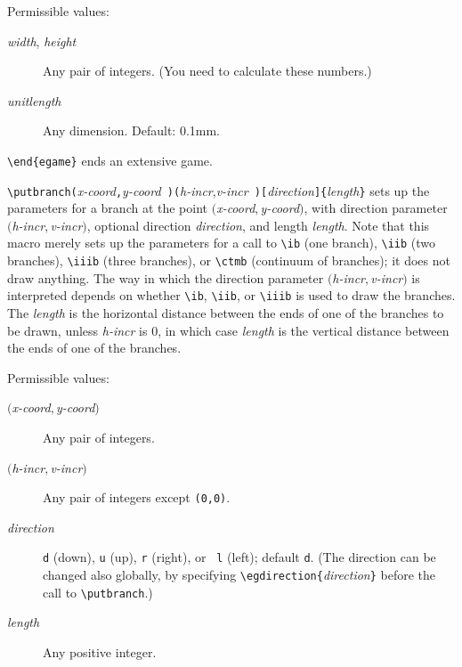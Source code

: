 \documentclass[12pt]{article}
\begin{document}
Permissible values:
\begin{description}
\item[\emph{width}, \emph{height}] Any pair of integers.  (You need to
calculate these numbers.)
\item[\emph{unitlength}] Any dimension.  Default: 0.1mm.
\end{description}

\vspace{4mm}

\noindent\verb+\end{egame}+\newline
\noindent ends an extensive game.

\vspace{4mm}

\noindent\verb+\putbranch(+\emph{x-coord}\verb+,+\emph{y-coord}{\tt
)(}\emph{h-incr},\emph{v-incr}{\tt
)[}\emph{direction}\verb+]{+\emph{length}\verb+}+\newline
\noindent sets up the parameters for a branch at the point
$($\emph{x-coord}$,$\emph{y-coord}$)$, with direction parameter
$($\emph{h-incr}$,$\emph{v-incr}$)$, optional direction \emph{direction}, and
length \emph{length}.  Note that this macro merely sets up the parameters for
a call to \verb+\ib+ (one branch), \verb+\iib+ (two branches), \verb+\iiib+
(three branches), or \verb+\ctmb+ (continuum of branches); it does not draw
anything.  The way in which the direction parameter
$($\emph{h-incr}$,$\emph{v-incr}$)$ is interpreted depends on whether
\verb+\ib+, \verb+\iib+, or \verb+\iiib+ is used to draw the branches.  The
\emph{length} is the horizontal distance between the ends of one of the
branches to be drawn, unless \emph{h-incr} is 0, in which case \emph{length}
is the vertical distance between the ends of one of the branches.

Permissible values:
\begin{description}
\item[$($\emph{x-coord}$,$\emph{y-coord}$)$] Any pair of integers.
\item[$($\emph{h-incr}$,$\emph{v-incr}$)$] Any pair of integers except
\verb+(0,0)+.
\item[\emph{direction}] {\tt d} (down), {\tt u} (up), {\tt r} (right), or {\tt
l} (left); default {\tt d}.  (The direction can be changed also globally, by
specifying \verb+\egdirection{+\emph{direction}\verb+}+ before the call to
\verb+\putbranch+.)
\item[\emph{length}] Any positive integer.
\end{description}
\end{document}
